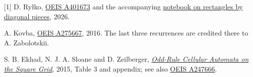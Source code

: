 \documentclass[12pt,a4paper]{article}
\begin{document}
\par
\small
[1] D. Ry{\l}ko, \href{https://oeis.org/A401673}{OEIS A401673} and the accompanying \href{https://github.com/dawidrylko/lattice-dimers/blob/master/notes/domicules/04-rectangles-by-diagonal-pieces.md}{notebook on rectangles by diagonal pieces}, 2026.\par
[2] A. Kovba, \href{https://oeis.org/A275667/internal}{OEIS A275667}, 2016. The last three recurrences are credited there to A. Zabolotskii.\par
[3] S. B. Ekhad, N. J. A. Sloane and D. Zeilberger, \href{https://neilsloane.com/doc/3X3.pdf}{\textit{Odd-Rule Cellular Automata on the Square Grid}}, 2015, Table 3 and appendix; see also \href{https://oeis.org/A247666}{OEIS A247666}.
\end{document}
